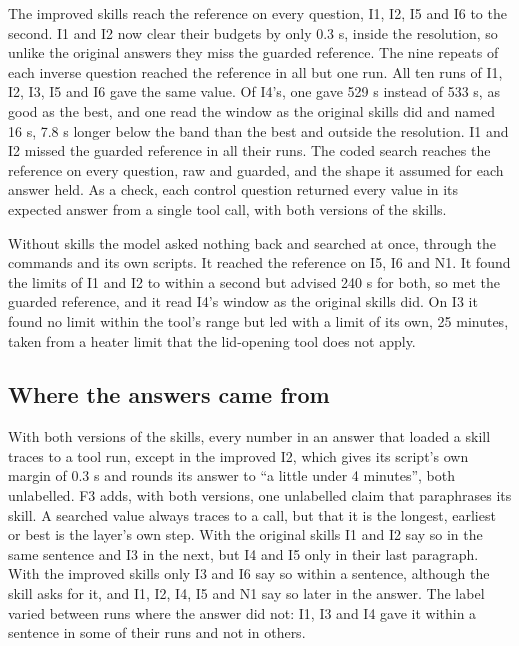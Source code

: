   The improved skills reach the reference on every question, I1, I2, I5 and I6 to the second.
  I1 and I2 now clear their budgets by only 0.3 s, inside the resolution, so unlike the original
  answers they miss the guarded reference. The nine repeats of each inverse question reached the
  reference in all but one run. All ten runs of I1, I2, I3, I5 and I6 gave the same value. Of
  I4's, one gave 529 s instead of 533 s, as good as the best, and one read the window as the
  original skills did and named 16 s, 7.8 s longer below the band than the best and outside the
  resolution. I1 and I2 missed the guarded reference in all their runs. The coded search reaches the reference on every question, raw and guarded, and the shape it assumed for each answer held. As
  a check, each control question returned every value in its expected answer from a single tool
  call, with both versions of the skills.

  Without skills the model asked nothing back and searched at once, through the commands and its
  own scripts. It reached the reference on I5, I6 and N1. It found the limits of I1 and I2 to within a second but advised
  240 s for both, so met the guarded reference, and it read I4's window as the original skills did.
  On I3 it found no limit within the tool's range but led with a limit of its own, 25 minutes,
  taken from a heater limit that the lid-opening tool does not apply.

  \subsection{Where the answers came from}
  \label{sec:results-provenance}

  With both versions of the skills, every number in an answer that loaded a skill traces to a tool
  run, except in the improved I2, which gives its script's own margin of 0.3 s and rounds its
  answer to ``a little under 4 minutes'', both unlabelled. F3 adds, with both versions, one
  unlabelled claim that paraphrases its skill. A searched value always traces to a call, but that
  it is the longest, earliest or best is the layer's own step. With the original skills I1 and I2
  say so in the same sentence and I3 in the next, but I4 and I5 only in their last paragraph. With the
  improved skills only I3 and I6 say so within a sentence, although the skill asks for it, and
  I1, I2, I4, I5 and N1 say so later in the answer. The label varied between runs where the
  answer did not: I1, I3 and I4 gave it within a sentence in some of their runs and not in others.


